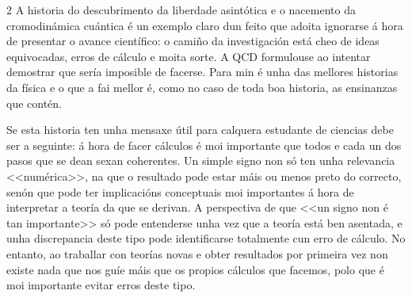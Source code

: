 \begin{multicols}{2}
A historia do descubrimento da liberdade asintótica e o nacemento da
cromodinámica cuántica é un exemplo claro dun feito que adoita ignorarse á hora
de presentar o avance científico: o camiño da investigación está cheo de ideas
equivocadas, erros de cálculo e moita sorte. A QCD formulouse ao intentar
demostrar que sería imposible de facerse. Para min é unha das mellores
historias da física e o que a fai mellor é, como no caso de toda boa historia,
as ensinanzas que contén.

Se esta historia ten unha mensaxe útil para calquera estudante de ciencias debe
ser a seguinte: á hora de facer cálculos é moi importante que todos e cada un
dos pasos que se dean sexan coherentes. Un simple signo non só ten unha
relevancia <<numérica>>, na que o resultado pode
estar máis ou menos preto do correcto, senón que pode ter implicacións
conceptuais moi importantes á hora de interpretar a teoría da que se derivan. A
perspectiva de que <<un signo non é tan importante>>
só pode entenderse unha vez que a teoría está ben asentada, e unha discrepancia
deste tipo pode identificarse totalmente cun erro de cálculo. No entanto, ao
traballar con teorías novas e obter resultados por primeira vez non existe nada
que nos guíe máis que os propios cálculos que facemos, polo que é moi
importante evitar erros deste tipo.


\printbibliography

\end{multicols}
